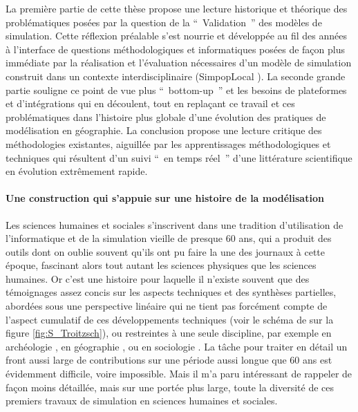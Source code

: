 La première partie de cette thèse propose une lecture historique et théorique des problématiques posées par la question de la \enquote{ Validation } des modèles de simulation. Cette réflexion préalable s'est nourrie et développée au fil des années à l'interface de questions méthodologiques et informatiques posées de façon plus immédiate par la réalisation et l'évaluation nécessaires d'un modèle de simulation construit dans un contexte interdisciplinaire (SimpopLocal \autocite{Schmitt2015}). La seconde grande partie souligne ce point de vue plus \foreignquote{english}{ bottom-up } et les besoins de plateformes et d'intégrations qui en découlent, tout en replaçant ce travail et ces problématiques dans l'histoire plus globale d'une évolution des pratiques de modélisation en géographie. La conclusion propose une lecture critique des méthodologies existantes, aiguillée par les apprentissages méthodologiques et techniques qui résultent d’un suivi \enquote{ en temps réel } d’une littérature scientifique en évolution extrêmement rapide.  

\paragraph*{Une construction qui s’appuie sur une histoire de la modélisation}

Les sciences humaines et sociales s'inscrivent dans une tradition d'utilisation de l'informatique et de la simulation vieille de presque 60 ans, qui a produit des outils dont on oublie souvent qu'ils ont pu faire la une des journaux à cette époque, fascinant alors tout autant les sciences physiques que les sciences humaines. Or c'est une histoire pour laquelle il n'existe souvent que des témoignages assez concis sur les aspects techniques et des synthèses partielles, abordées sous une perspective linéaire qui ne tient pas forcément compte de l'aspect cumulatif de ces développements techniques (voir le schéma de \autocite{Troitzsch1997} sur la figure \ref{fig:S_Troitzsch})⁠, ou restreintes à une seule discipline, par exemple en archéologie \autocite{Lake2013}, en géographie \autocite{Sanders2013}, ou en sociologie \autocite{Manzo2007}. La tâche pour traiter en détail un front aussi large de contributions sur une période aussi longue que 60 ans est évidemment difficile, voire impossible. Mais il m'a paru intéressant de rappeler de façon moins détaillée, mais sur une portée plus large, toute la diversité de ces premiers travaux de simulation en sciences humaines et sociales.

